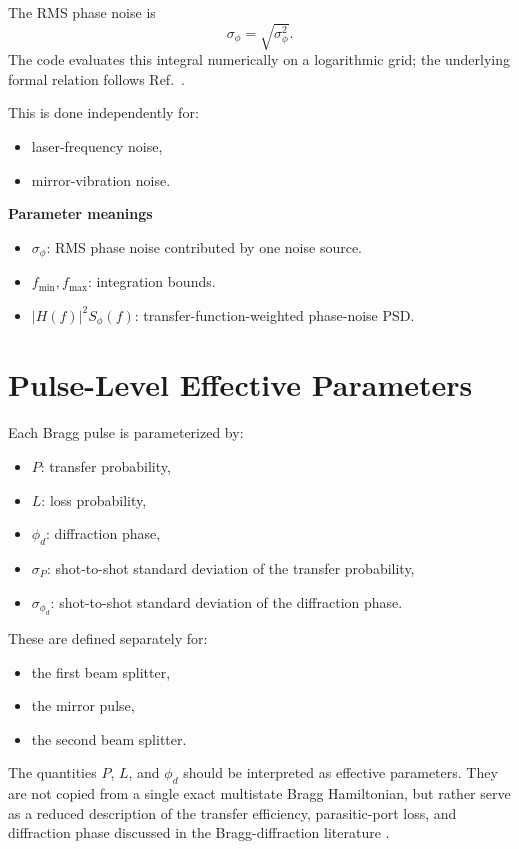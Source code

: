\documentclass[11pt,a4paper]{article}
\begin{document}
The RMS phase noise is
\begin{equation}
  \sigma_{\phi} = \sqrt{\sigma_{\phi}^2}.
\end{equation}
The code evaluates this integral numerically on a logarithmic grid; the underlying formal relation follows Ref.~\cite{Cheinet2008}.

This is done independently for:
\begin{itemize}[leftmargin=1.5em]
  \item laser-frequency noise,
  \item mirror-vibration noise.
\end{itemize}

\textbf{Parameter meanings}
\begin{itemize}[leftmargin=1.5em]
  \item $\sigma_{\phi}$: RMS phase noise contributed by one noise source.
  \item $f_{\min}, f_{\max}$: integration bounds.
  \item $|H(f)|^2 S_{\phi}(f)$: transfer-function-weighted phase-noise PSD.
\end{itemize}

\section{Pulse-Level Effective Parameters}

Each Bragg pulse is parameterized by:
\begin{itemize}[leftmargin=1.5em]
  \item $P$: transfer probability,
  \item $L$: loss probability,
  \item $\phi_d$: diffraction phase,
  \item $\sigma_P$: shot-to-shot standard deviation of the transfer probability,
  \item $\sigma_{\phi_d}$: shot-to-shot standard deviation of the diffraction phase.
\end{itemize}

These are defined separately for:
\begin{itemize}[leftmargin=1.5em]
  \item the first beam splitter,
  \item the mirror pulse,
  \item the second beam splitter.
\end{itemize}
The quantities $P$, $L$, and $\phi_d$ should be interpreted as effective parameters. They are not copied from a single exact multistate Bragg Hamiltonian, but rather serve as a reduced description of the transfer efficiency, parasitic-port loss, and diffraction phase discussed in the Bragg-diffraction literature \cite{Muller2008,Estey2015,Parker2016,Jenewein2022}.
\end{document}
